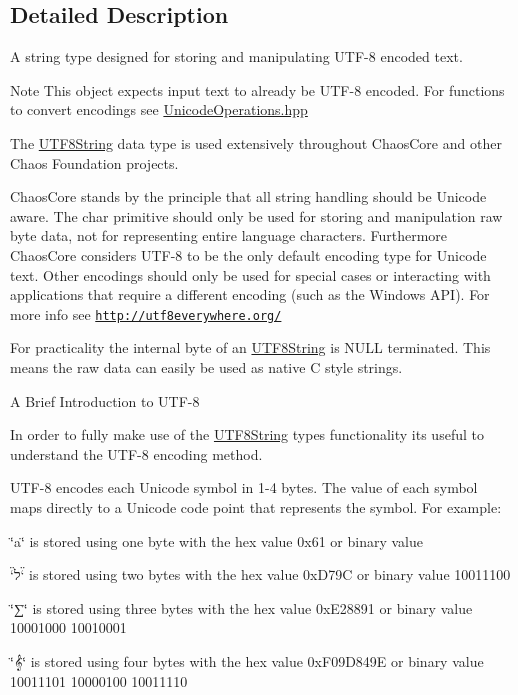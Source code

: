 \subsection{Detailed Description}
A string type designed for storing and manipulating U\+T\+F-\/8 encoded text. 

\begin{DoxyNote}{Note}
This object expects input text to already be U\+T\+F-\/8 encoded. For functions to convert encodings see \hyperlink{_unicode_operations_8hpp}{Unicode\+Operations.\+hpp}
\end{DoxyNote}
The \hyperlink{classchaos_1_1str_1_1_u_t_f8_string}{U\+T\+F8\+String} data type is used extensively throughout Chaos\+Core and other Chaos Foundation projects.

Chaos\+Core stands by the principle that all string handling should be Unicode aware. The {\ttfamily char} primitive should only be used for storing and manipulation raw byte data, not for representing entire language characters. Furthermore Chaos\+Core considers U\+T\+F-\/8 to be the only default encoding type for Unicode text. Other encodings should only be used for special cases or interacting with applications that require a different encoding (such as the Windows A\+P\+I). For more info see \href{http://utf8everywhere.org/}{\tt http\+://utf8everywhere.\+org/}

For practicality the internal byte of an \hyperlink{classchaos_1_1str_1_1_u_t_f8_string}{U\+T\+F8\+String} is N\+U\+L\+L terminated. This means the raw data can easily be used as native C style strings.

\begin{DoxyParagraph}{A Brief Introduction to U\+T\+F-\/8}

\end{DoxyParagraph}
In order to fully make use of the \hyperlink{classchaos_1_1str_1_1_u_t_f8_string}{U\+T\+F8\+String} type\textquotesingle{}s functionality its useful to understand the U\+T\+F-\/8 encoding method.

U\+T\+F-\/8 encodes each Unicode symbol in 1-\/4 bytes. The value of each symbol maps directly to a Unicode code point that represents the symbol. For example\+:


\begin{DoxyItemize}
\item \char`\"{}a\char`\"{} is stored using one byte with the hex value 0x61 or binary value {}
\item \char`\"{}ל\char`\"{} is stored using two bytes with the hex value 0x\+D79\+C or binary value { 10011100}
\item \char`\"{}∑\char`\"{} is stored using three bytes with the hex value 0x\+E28891 or binary value { 10001000 10010001}
\item \char`\"{}𝄞\char`\"{} is stored using four bytes with the hex value 0x\+F09\+D849\+E or binary value { 10011101 10000100 10011110}
\end{DoxyItemize}


